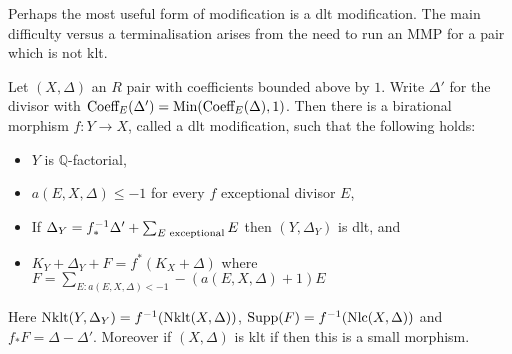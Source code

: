 Perhaps the most useful form of modification is a dlt modification. The main difficulty versus a terminalisation arises from the need to run an MMP for a pair which is not klt.

\begin{theorem}\label{dlt-mod}
	Let $(X,\Delta)$ an $R$ pair with coefficients bounded above by $1$. Write $\Delta'$ for the divisor with $\textup{Coeff}_{E}(\Delta')=\textup{Min}(\textup{Coeff}_{E}(\Delta),1)$. Then there is a birational morphism $f:Y \to X$, called a dlt modification, such that the following holds:
	\begin{itemize}
		\item $Y$ is $\mathbb{Q}$-factorial,
		\item $a(E,X,\Delta) \leq -1$ for every $f$ exceptional divisor $E$,
		\item If $\Delta_{Y}=f^{-1}_{*}\Delta' + \sum_{E \textup{ exceptional}} E$ then $(Y,\Delta_{Y})$ is dlt, and
		\item $K_{Y}+\Delta_{Y}+F=f^{*}(K_{X}+\Delta)$ where $F= \sum_{E:a(E,X,\Delta)<-1} -(a(E,X,\Delta)+1)E$
	\end{itemize}
	Here $\textup{Nklt}(Y,\Delta_{Y})=f^{-1}(\textup{Nklt}(X,\Delta))$, $\text{Supp}(F)=f^{-1}(\textup{Nlc}(X,\Delta))$ and $f_{*}F=\Delta-\Delta'$. Moreover if $(X,\Delta)$ is klt if then this is a small morphism.
\end{theorem}

